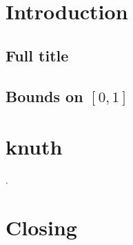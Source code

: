 \documentclass{article}
\begin{document}
\section[Intro]{Introduction}
\subsection[Short]
  {Full title}
\subsection[{$[0,1]$} \] bound]{Bounds on $[0,1]$}

\section[{Draft}

We follow \cite[p.~3]{knuth}.

\section*[Last]{Closing}
\end{document}
